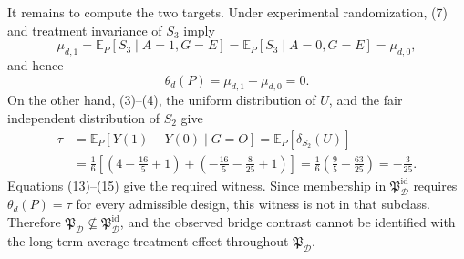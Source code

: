 It remains to compute the two targets.  Under experimental randomization, (7) and treatment invariance of \(S_3\) imply
\[
 \mu_{d,1}=\mathbb E_P[S_3\mid A=1,G=E]
 =\mathbb E_P[S_3\mid A=0,G=E]=\mu_{d,0},
\]
and hence
\[
 \theta_d(P)=\mu_{d,1}-\mu_{d,0}=0.
 \tag{14}
\]
On the other hand, (3)--(4), the uniform distribution of \(U\), and the fair independent distribution of \(S_2\) give
\[
 \begin{aligned}
 \tau
 &=\mathbb E_P[Y(1)-Y(0)\mid G=O]
 =\mathbb E_P[\delta_{S_2}(U)]\\
 &=\frac16\left[
 \left(4-\frac{16}{5}+1\right)
 +\left(-\frac{16}{5}-\frac8{25}+1\right)
 \right]
 =\frac16\left(\frac95-\frac{63}{25}\right)
 =-\frac3{25}.
 \end{aligned}
 \tag{15}
\]
Equations (13)--(15) give the required witness.  Since membership in \(\mathfrak P_{\mathcal D}^{\mathrm{id}}\) requires \(\theta_d(P)=\tau\) for every admissible design, this witness is not in that subclass.  Therefore \(\mathfrak P_{\mathcal D}\not\subseteq\mathfrak P_{\mathcal D}^{\mathrm{id}}\), and the observed bridge contrast cannot be identified with the long-term average treatment effect throughout \(\mathfrak P_{\mathcal D}\).